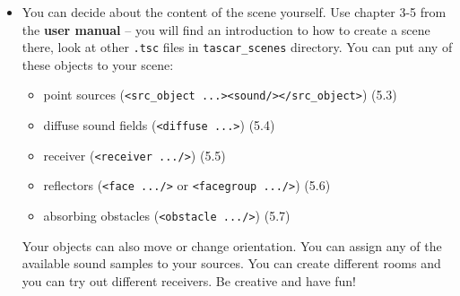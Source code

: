 \documentclass[11pt,a4paper,twoside]{article}
\begin{document}
\begin{itemize}
\item You can decide about the content of the scene yourself. Use
  chapter 3-5 from the \textbf{user manual} -- you will find an
  introduction to how to create a scene there, look at other \verb!.tsc!
  files in \verb!tascar_scenes! directory. You can put any of these
  objects to your scene:
  \begin{itemize}
  \item point sources (\verb!<src_object ...><sound/></src_object>!) (5.3)
  \item diffuse sound fields (\verb!<diffuse ...>!) (5.4)
  \item receiver (\verb!<receiver .../>!) (5.5)
  \item reflectors (\verb!<face .../>! or \verb!<facegroup .../>!) (5.6)
  \item absorbing obstacles (\verb!<obstacle .../>!) (5.7)
  \end{itemize}

  Your objects can also move or change orientation. You can assign any
  of the available sound samples to your sources.  You can create
  different rooms and you can try out different receivers. Be creative
  and have fun!

\end{itemize}
\end{document}
